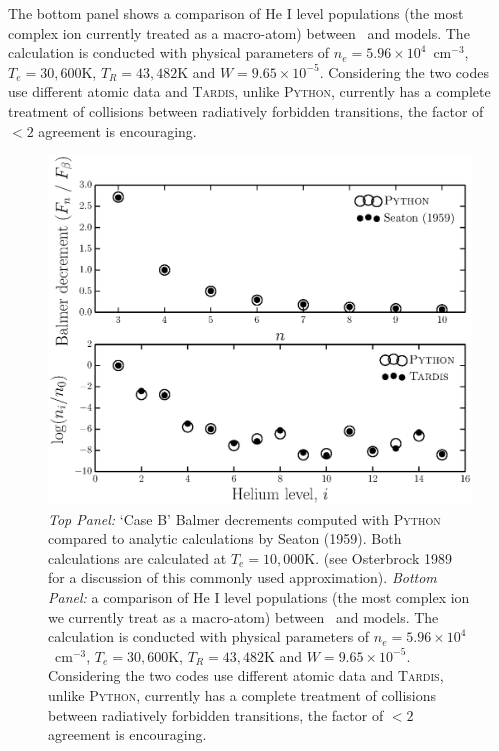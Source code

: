 The bottom panel shows a comparison of He I level populations 
(the most complex ion currently 
treated as a macro-atom) between \py\ and \tar models.
The calculation is conducted with physical parameters of $n_e=5.96\times10^4$~cm$^{-3}$,
$T_e=30,600$K, $T_R=43,482$K and $W=9.65\times10^{-5}$. 
Considering the two codes use different atomic data and 
\textsc{Tardis,} unlike \textsc{Python,} currently has a 
complete treatment of collisions between 
radiatively forbidden transitions, the factor of 
$<2$ agreement is encouraging. 

\begin{figure}
\centering
\includegraphics[width=1.0\textwidth]{figures/05-cvpaper/fig_caseb_tardis.eps}
\caption{
{\sl Top Panel:} `Case B' Balmer decrements computed 
with \textsc{Python} compared to analytic calculations
by Seaton (1959). Both calculations are calculated at $T_e=10,000$K.
(see Osterbrock 1989 for a discussion of this commonly used approximation).
{\sl Bottom Panel:}  a comparison of He I level populations (the most complex ion we currently 
treat as a macro-atom) between \py\ and \tar models. 
The calculation is conducted with physical parameters of $n_e=5.96\times10^4$~cm$^{-3}$,
$T_e=30,600$K, $T_R=43,482$K and $W=9.65\times10^{-5}$. 
Considering the two codes use different atomic data and 
\textsc{Tardis,} unlike \textsc{Python,} currently has a 
complete treatment of collisions between 
radiatively forbidden transitions, the factor of 
$<2$ agreement is encouraging. 
}
\label{fig:caseb_tests}
\end{figure}

